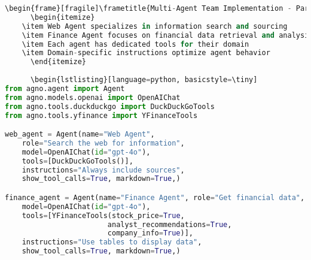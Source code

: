 \begin{frame}[fragile]
\begin{lstlisting}[language=python, basicstyle=\tiny]
%%%%%%%%%%%%%%%%%%%%%%%%%%%%%%%%%%%%%%%%%%%%%%%%%%%%%%%%%%%
\begin{frame}[fragile]\frametitle{Multi-Agent Team Implementation - Part 1}
      \begin{itemize}
	\item Web Agent specializes in information search and sourcing
	\item Finance Agent focuses on financial data retrieval and analysis
	\item Each agent has dedicated tools for their domain
	\item Domain-specific instructions optimize agent behavior
	  \end{itemize}
      
      \begin{lstlisting}[language=python, basicstyle=\tiny]
from agno.agent import Agent
from agno.models.openai import OpenAIChat
from agno.tools.duckduckgo import DuckDuckGoTools
from agno.tools.yfinance import YFinanceTools

web_agent = Agent(name="Web Agent",
    role="Search the web for information",
    model=OpenAIChat(id="gpt-4o"),
    tools=[DuckDuckGoTools()],
    instructions="Always include sources",
    show_tool_calls=True, markdown=True,)

finance_agent = Agent(name="Finance Agent", role="Get financial data",
    model=OpenAIChat(id="gpt-4o"),
    tools=[YFinanceTools(stock_price=True, 
                        analyst_recommendations=True,
                        company_info=True)],
    instructions="Use tables to display data",
    show_tool_calls=True, markdown=True,)
      \end{lstlisting}
\end{frame}

